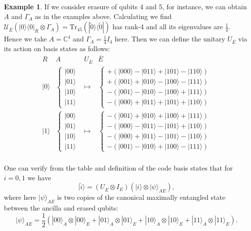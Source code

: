 \documentclass[11pt]{amsart}
\theoremstyle{definition}
\newtheorem{example}[thm]{Example}
\theoremstyle{definition}
\theoremstyle{definition}
\newcommand{\tr}{\textrm{Tr}}
\newcommand{\1}{\mathbb{I}}
\def\ket#1{| #1 \rangle}
\def\kb#1#2{|#1\rangle\!\langle #2 |}
\begin{document}
\begin{example}
If we consider erasure of qubits 4 and 5, for instance, we can obtain $A$ and $\Gamma_A$ as in the examples above. Calculating we find 
$\mathcal U_{\overline{E}} (\kb{0}{0}_R \otimes \Gamma_A) = \tr_{45} (\kb{\widetilde{0}}{\widetilde{0}} )$ has rank-4 and all its eigenvalues are $\frac14$. 
Hence we take $A = \mathbb C^4$ and $\Gamma_A = \frac14 I_4$ here. Then we can define the unitary $U_{\overline{E}}$ via its action on basis states as follows:
\[
\begin{array}{cccc} 
R & A & U_{\overline{E}}  & \overline{E}  \\ \hline 
\ket{0} & \left\{ \begin{array}{l}  \ket{00} \\ \ket{01} \\ \ket{10} \\ \ket{11} \end{array} \right. & \longmapsto & \left\{ \begin{array}{l} +(\ket{000} - \ket{011} + \ket{101} - \ket{110}) \\ +(\ket{001} + \ket{010} - \ket{100} - \ket{111}) \\ -(\ket{001} - \ket{010} - \ket{100} + \ket{111}) \\ -(\ket{000} + \ket{011} + \ket{101} + \ket{110}) \end{array} \right. \\ 
\ket{1} & \left\{ \begin{array}{l}  \ket{00} \\ \ket{01} \\ \ket{10} \\ \ket{11} \end{array} \right. & \longmapsto & \left\{ \begin{array}{l} -(\ket{001} + \ket{010} +\ket{100} + \ket{111}) \\ -(\ket{000} - \ket{011} - \ket{101} + \ket{110}) \\ -(\ket{000} + \ket{011} - \ket{101} - \ket{110}) \\ -(\ket{001} - \ket{010} + \ket{100} - \ket{111}) \end{array} \right. \\  
\end{array} 
\]

One can verify from the table and definition of the code basis states that for $i=0,1$ we have 
\begin{equation*}
    \ket{\widetilde{i}}=\left(U_{\overline{E}}\otimes I_E\right)\left(\ket{i}\otimes\ket{\psi}_{AE}\right),
\end{equation*}
where here $\ket{\psi}_{AE}$ is two copies of the canonical maximally entangled state between the ancilla and erased qubits:
\begin{equation*}
    \ket{\psi}_{AE}=\frac{1}{2}\left(\ket{00}_A\otimes\ket{00}_E+\ket{01}_A\otimes\ket{01}_E+\ket{10}_A\otimes\ket{10}_E+\ket{11}_A\otimes\ket{11}_E\right).
\end{equation*}


\end{example}
\end{document}
